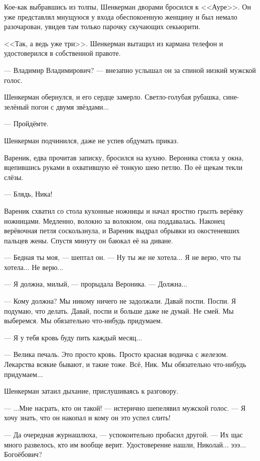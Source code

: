 Кое-как выбравшись из толпы, Шенкерман дворами бросился к <<Ауре>>.
Он уже представлял мнущуюся у входа обеспокоенную женщину и был немало разочарован, увидев там только парочку скучающих секьюрити.

<<Так, а ведь уже три>>.
Шенкерман вытащил из кармана телефон и удостоверился в собственной правоте.

--- Владимир Владимирович? --- внезапно услышал он за спиной низкий мужской голос.

Шенкерман обернулся, и его сердце замерло.
Светло-голубая рубашка, сине-зелёный погон с двумя звёздами...

--- Пройдёмте.

Шенкерман подчинился, даже не успев обдумать приказ.

\asterism

Вареник, едва прочитав записку, бросился на кухню.
Вероника стояла у окна, вцепившись руками в охватившую её тонкую шею петлю.
По её щекам текли слёзы.

--- Блядь, Ника!

Вареник схватил со стола кухонные ножницы и начал яростно грызть верёвку ножницами.
Медленно, волокно за волокном, она поддавалась.
Наконец верёвочная петля соскользнула, и Вареник выдрал обрывки из окостеневших пальцев жены.
Спустя минуту он баюкал её на диване.

--- Бедная ты моя, --- шептал он.
--- Ну ты же не хотела...
Я не верю, что ты хотела...
Не верю...

--- Я должна, милый, --- прорыдала Вероника.
--- Должна...

--- Кому должна?
Мы никому ничего не задолжали.
Давай поспи.
Поспи.
Я подумаю, что делать.
Давай, поспи и больше даже не думай.
Не смей.
Мы выберемся.
Мы обязательно что-нибудь придумаем.

--- Я у тебя кровь буду пить каждый месяц...

--- Велика печаль.
Это просто кровь.
Просто красная водичка с железом.
Лекарства всякие бывают, и такие тоже.
Всё, Ник.
Мы обязательно что-нибудь придумаем...

\asterism

Шенкерман затаил дыхание, прислушиваясь к разговору.

--- ...Мне насрать, кто он такой! --- истерично шепелявил мужской голос.
--- Я хочу знать, что он накопал и кому он это успел слить!

--- Да очередная журнашлюха, --- успокоительно пробасил другой.
--- Их щас много развелось, кто им вообще верит.
Удостоверение нашли, Николай... эээ... Богоёбович?

